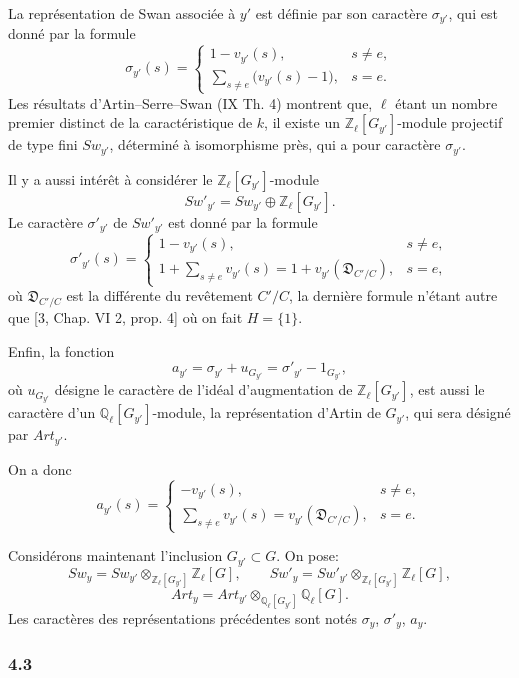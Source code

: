 \documentclass[11pt]{article}
\begin{document}
La représentation de Swan associée à $y'$ est définie par son caractère $\sigma_{y'}$, qui est donné par la formule
\[
\sigma_{y'}(s)=
\begin{cases}
1-v_{y'}(s),& s\ne e,\\[0.4em]
\displaystyle\sum_{s\ne e}\bigl(v_{y'}(s)-1\bigr),& s=e.
\end{cases}
\tag{4.2.2}
\]
Les résultats d'Artin--Serre--Swan (IX Th. 4) montrent que, $\ell$ étant un nombre premier distinct de la caractéristique de $k$, il existe un $\mathbb Z_\ell[G_{y'}]$-module projectif de type fini $Sw_{y'}$, déterminé à isomorphisme près, qui a pour caractère $\sigma_{y'}$.

Il y a aussi intérêt à considérer le $\mathbb Z_\ell[G_{y'}]$-module
\[
Sw'_{y'}=Sw_{y'}\oplus\mathbb Z_\ell[G_{y'}].
\tag{4.2.3}
\]
Le caractère $\sigma'_{y'}$ de $Sw'_{y'}$ est donné par la formule
\[
\sigma'_{y'}(s)=
\begin{cases}
1-v_{y'}(s),& s\ne e,\\[0.4em]
\displaystyle 1+\sum_{s\ne e}v_{y'}(s)
=1+v_{y'}(\mathfrak D_{C'/C}),& s=e,
\end{cases}
\tag{4.2.4}
\]
où $\mathfrak D_{C'/C}$ est la différente du revêtement $C'/C$, la dernière formule n'étant autre que [3, Chap. VI 2, prop. 4] où on fait $H=\{1\}$.

Enfin, la fonction
\[
a_{y'}=\sigma_{y'}+u_{G_{y'}}=\sigma'_{y'}-1_{G_{y'}},
\tag{4.2.5}
\]
où $u_{G_{y'}}$ désigne le caractère de l'idéal d'augmentation de $\mathbb Z_\ell[G_{y'}]$, est aussi le caractère d'un $\mathbb Q_\ell[G_{y'}]$-module, la représentation d'Artin de $G_{y'}$, qui sera désigné par $Art_{y'}$.

On a donc
\[
a_{y'}(s)=
\begin{cases}
-v_{y'}(s),& s\ne e,\\[0.4em]
\displaystyle\sum_{s\ne e}v_{y'}(s)=v_{y'}(\mathfrak D_{C'/C}),& s=e.
\end{cases}
\tag{4.2.6}
\]

Considérons maintenant l'inclusion $G_{y'}\subset G$. On pose:
\[
Sw_y=Sw_{y'}\otimes_{\mathbb Z_\ell[G_{y'}]}\mathbb Z_\ell[G],
\qquad
Sw'_y=Sw'_{y'}\otimes_{\mathbb Z_\ell[G_{y'}]}\mathbb Z_\ell[G],
\tag{4.2.7}
\]
\[
Art_y=Art_{y'}\otimes_{\mathbb Q_\ell[G_{y'}]}\mathbb Q_\ell[G].
\tag{4.2.8}
\]
Les caractères des représentations précédentes sont notés $\sigma_y$, $\sigma'_y$, $a_y$.

\subsubsection*{4.3}
\end{document}
